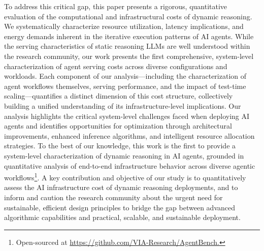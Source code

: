 To address this critical gap, this paper presents a rigorous, quantitative evaluation of the computational and infrastructural costs of dynamic reasoning. We systematically characterize resource utilization, latency implications, and energy demands inherent in the iterative execution patterns of AI agents.
While the serving characteristics of static reasoning LLMs are well understood within the research community, our work presents the first comprehensive, system-level characterization of agent serving costs across diverse configurations and workloads. Each component of our analysis—including the characterization of agent workflows themselves, serving performance, and the impact of test-time scaling—quantifies a distinct dimension of this cost structure, collectively building a unified understanding of its infrastructure-level implications.
Our analysis highlights the critical system-level challenges faced when deploying AI agents and identifies opportunities for optimization through architectural improvements, enhanced inference algorithms, and intelligent resource allocation strategies. To the best of our knowledge, this work is the first to provide a system-level characterization of dynamic reasoning in AI agents, grounded in quantitative analysis of end-to-end infrastructure behavior across diverse agentic workflows\footnote{Open-sourced at \href{https://github.com/VIA-Research/AgentBench}{https://github.com/VIA-Research/AgentBench.}}. A key contribution and objective of our study is to quantitatively assess the AI infrastructure cost of dynamic reasoning deployments, and to inform and caution the research community about the urgent need for sustainable, efficient design principles to bridge the gap between advanced algorithmic capabilities and practical, scalable, and sustainable deployment.
